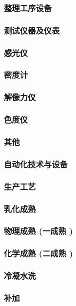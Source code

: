 \documentclass[UTF8]{../../ApplicationUniverse}
\begin{document}
    \subsubsection{整理工序设备}
    \subsubsection{测试仪器及仪表}
        \subsubsection{感光仪}
        \subsubsection{密度计}
        \subsubsection{解像力仪}
        \subsubsection{色度仪}
        \subsubsection{其他}
    \subsubsection{自动化技术与设备}
\subsubsection{生产工艺}
    \subsubsection{乳化成熟}
        \subsubsection{物理成熟 (一成熟 )}
        \subsubsection{化学成熟 (二成熟 )}
    \subsubsection{冷凝水洗}
        \subsubsection{补加}
\end{document}

